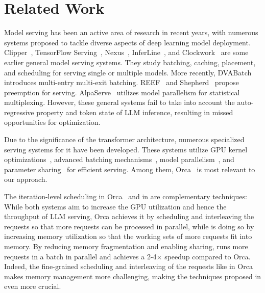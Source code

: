 \section{Related Work}
\label{sec:related_work}

Model serving has been an active area of research in recent years, with numerous systems proposed to tackle diverse aspects of deep learning model deployment.
Clipper~\cite{crankshaw2017clipper}, TensorFlow Serving~\cite{olston2017tensorflow}, Nexus~\cite{shen2019nexus}, InferLine~\cite{crankshaw2020inferline}, and
Clockwork~\cite{gujarati2020serving} are some earlier general model serving systems. They study batching, caching, placement, and scheduling for serving single or multiple models.
More recently, DVABatch~\cite{cui2022dvabatch} introduces multi-entry multi-exit batching. REEF~\cite{han2022microsecond} and  Shepherd~\cite{zhang2023shepherd} propose preemption for serving. AlpaServe~\cite{li2023alpaserve} utilizes model parallelism for statistical multiplexing.
However, these general systems fail to take into account the auto-regressive property and token state of LLM inference, resulting in missed opportunities for optimization.

Due to the significance of the transformer architecture, numerous specialized serving systems for it have been developed. These systems utilize GPU kernel optimizations~\cite{wang2021lightseq,aminabadi2022deepspeed,nvidiaft,ma2020rammer},
advanced batching mechanisms~\cite{fang2021turbotransformers,yu2022orca},
model parallelism~\cite{pope2022efficiently,yu2022orca,aminabadi2022deepspeed}, and parameter sharing~\cite{zhou2022pets} for efficient serving.
Among them, Orca~\cite{yu2022orca} is most relevant to our approach.

The iteration-level scheduling in Orca~\cite{yu2022orca} and \tech in \sys are complementary techniques: While both systems aim to increase the GPU utilization and hence the throughput of LLM serving, Orca achieves it by scheduling and interleaving the requests so that more requests can be processed in parallel, while \sys is doing so by increasing memory utilization so that the working sets of more requests fit into memory.
By reducing memory fragmentation and enabling sharing, \sys runs more requests in a batch in parallel and achieves a 2-4$\times$ speedup compared to Orca.
Indeed, the fine-grained scheduling and interleaving of the requests like in Orca makes memory management more challenging, making the techniques proposed in \sys even more crucial.

